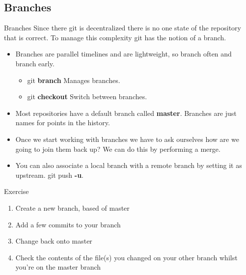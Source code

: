 \documentclass{beamer}
\begin{document}
\subsection{Branches}
\begin{frame}[fragile]{Branches}
  Since there git is decentralized there is no one state of the repository that is correct. To manage this complexity git has the notion of a branch. 
  \begin{itemize}
    \item Branches are parallel timelines and are lightweight, so branch often and branch early.
  \begin{block}{}
    \begin{itemize}
      \item git \textbf{branch}  Manages branches. 
      \item git \textbf{checkout} Switch between branches.
    \end{itemize}
  \end{block}
    \item Most repositories have a default branch called \textbf{master}. Branches are just names for points in the history.
    \item Once we start working with branches we have to ask ourselves how are we going to join them back up? We can do this by performing a merge.

    \item You can also associate a local branch with a remote branch by setting it as upstream. git push \textbf{-u}.
  \end{itemize}
\end{frame}

\begin{frame}
  \begin{block}{Exercise}
    \begin{enumerate}
      \item Create a new branch, based of master
      \item Add a few commits to your branch
      \item Change back onto master
      \item Check the contents of the file(s) you changed on your other branch whilst you\rq{}re on the master branch
    \end{enumerate}
  \end{block}
\end{frame}
\end{document}
